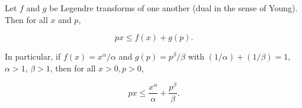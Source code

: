 Let $f$ and $g$ be Legendre transforms of one another (dual in the sense of Young). Then for all $x$ and $p$,

$$px \leq f(x) + g(p).$$

In particular, if $f(x) = x^\alpha/\alpha$ and $g(p) = p^\beta/\beta$ with $(1/\alpha) + (1/\beta) = 1$, $\alpha > 1$, $\beta > 1$, then for all $x > 0, p > 0$,

$$px \leq \frac{x^\alpha}{\alpha} + \frac{p^\beta}{\beta}.$$
